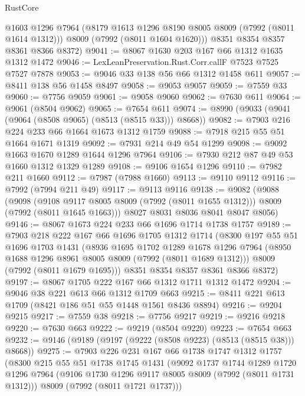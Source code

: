 \begin{lexlean}{RustCore}
\begin{coremodule}
        @1603
        @1296
        @7964
        (@8179 @1613 @1296 @8190 @8005 @8009 (@7992 (@8011 @1614 @1312)))
        @8009
        (@7992 (@8011 @1604 @1620)))
      @8351
      @8354
      @8357
      @8361
      @8366
      @8372)
@9041 := @8067 @1630 @203 @167 @66 @1312 @1635 @1312 @1472
@9046 := LexLeanPreservation.Rust.Corr.callF @7523 @7525 @7527 @7878
@9053 := @9046 @33 @138 @56 @66 @1312 @1458 @611
@9057 := @8411 @138 @56 @1458 @8497
@9058 := @9053 @9057
@9059 := @7559 @33
@9060 := @7756 @9059
@9061 := @9058 @9060
@9062 := @7630 @611
@9064 := @9061 (@8504 @9062)
@9065 := @7654 @611
@9074 := @8990 (@9033 (@9041 (@9064 (@8508 @9065) (@8513 (@8515 @33))) @8668))
@9082 := @7903 @216 @224 @233 @66 @1664 @1673 @1312 @1759
@9088 := @7918 @215 @55 @51 @1664 @1671 @1319
@9092 := @7931 @214 @49 @54 @1299
@9098 := @9092 @1663 @1670 @1289 @1644 @1296 @7964
@9106 := @7930 @212 @87 @49 @53 @1660 @1312 @1329 @1289
@9108 := @9106 @1654 @1296
@9110 := @7982 @211 @1660
@9112 := @7987 (@7988 @1660)
@9113 := @9110 @9112
@9116 := @7992 (@7994 @211 @49)
@9117 := @9113 @9116
@9138 := @9082
    (@9088
      (@9098
        (@9108 @9117 @8005 @8009 (@7992 (@8011 @1655 @1312)))
        @8009
        (@7992 (@8011 @1645 @1663)))
      @8027
      @8031
      @8036
      @8041
      @8047
      @8056)
@9146 := @8067 @1673 @224 @233 @66 @1696 @1714 @1738 @1757
@9189 := @7903
    @218
    @222
    @167
    @66
    @1696
    @1705
    @1312
    @1714
    (@8300
      @197
      @55
      @51
      @1696
      @1703
      @1431
      (@8936
        @1695
        @1702
        @1289
        @1678
        @1296
        @7964
        (@8950 @1688 @1296 @8961 @8005 @8009 (@7992 (@8011 @1689 @1312)))
        @8009
        (@7992 (@8011 @1679 @1695)))
      @8351
      @8354
      @8357
      @8361
      @8366
      @8372)
@9197 := @8067 @1705 @222 @167 @66 @1312 @1711 @1312 @1472
@9204 := @9046 @38 @221 @613 @66 @1312 @1709 @663
@9215 := @8411 @221 @613 @1709 (@8421 @186 @51 @55 @1448 @1561 @8436 @8894)
@9216 := @9204 @9215
@9217 := @7559 @38
@9218 := @7756 @9217
@9219 := @9216 @9218
@9220 := @7630 @663
@9222 := @9219 (@8504 @9220)
@9223 := @7654 @663
@9232 := @9146 (@9189 (@9197 (@9222 (@8508 @9223) (@8513 (@8515 @38))) @8668))
@9275 := @7903
    @226
    @231
    @167
    @66
    @1738
    @1747
    @1312
    @1757
    (@8300
      @215
      @55
      @51
      @1738
      @1745
      @1431
      (@9092
        @1737
        @1744
        @1289
        @1720
        @1296
        @7964
        (@9106 @1730 @1296 @9117 @8005 @8009 (@7992 (@8011 @1731 @1312)))
        @8009
        (@7992 (@8011 @1721 @1737)))

\end{coremodule}
\end{lexlean}
